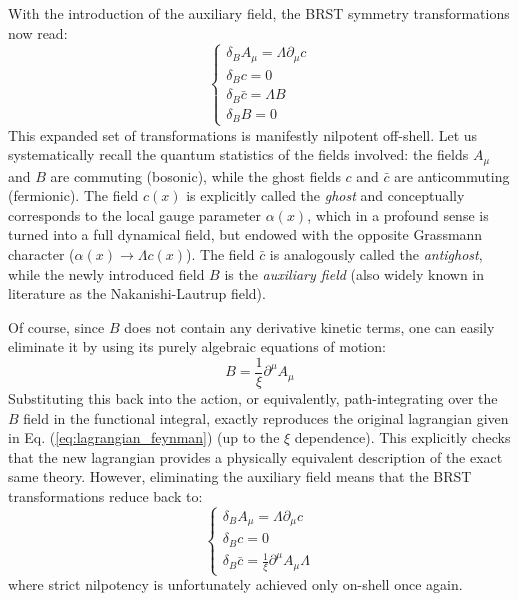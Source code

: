 With the introduction of the auxiliary field, the BRST symmetry transformations now read:
\begin{equation} \label{eq:brst_transformations_off_shell}
    \begin{cases}
        \delta_B A_\mu = \Lambda \partial_\mu c \\
        \delta_B c = 0                          \\
        \delta_B \bar{c} = \Lambda B            \\
        \delta_B B = 0
    \end{cases}
\end{equation}
This expanded set of transformations is manifestly nilpotent off-shell. Let us systematically recall the quantum statistics of the fields involved: the fields \(A_\mu\) and \(B\) are commuting (bosonic), while the ghost fields \(c\) and \(\bar{c}\) are anticommuting (fermionic). The field \(c(x)\) is explicitly called the \textit{ghost} and conceptually corresponds to the local gauge parameter \(\alpha(x)\), which in a profound sense is turned into a full dynamical field, but endowed with the opposite Grassmann character (\(\alpha(x) \rightarrow \Lambda c(x)\)). The field \(\bar{c}\) is analogously called the \textit{antighost}, while the newly introduced field \(B\) is the \textit{auxiliary field} (also widely known in literature as the Nakanishi-Lautrup field).

Of course, since \(B\) does not contain any derivative kinetic terms, one can easily eliminate it by using its purely algebraic equations of motion:
\begin{equation} \label{eq:b_equation_of_motion}
    B = \frac{1}{\xi} \partial^\mu A_\mu
\end{equation}
Substituting this back into the action, or equivalently, path-integrating over the \(B\) field in the functional integral, exactly reproduces the original lagrangian given in Eq. (\ref{eq:lagrangian_feynman}) (up to the \(\xi\) dependence). This explicitly checks that the new lagrangian provides a physically equivalent description of the exact same theory. However, eliminating the auxiliary field means that the BRST transformations reduce back to:
\begin{equation} \label{eq:brst_transformations_reduced}
    \begin{cases}
        \delta_B A_\mu = \Lambda \partial_\mu c \\
        \delta_B c = 0                          \\
        \delta_B \bar{c} = \frac{1}{\xi} \partial^\mu A_\mu \Lambda
    \end{cases}
\end{equation}
where strict nilpotency is unfortunately achieved only on-shell once again.

